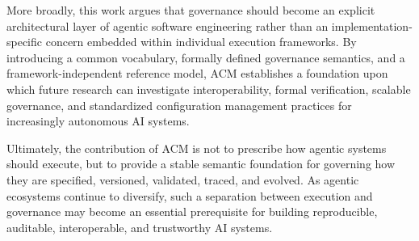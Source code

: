 \documentclass[10pt]{article}
\begin{document}
More broadly, this work argues that governance should become an explicit architectural layer of agentic software engineering rather than an implementation-specific concern embedded within individual execution frameworks. By introducing a common vocabulary, formally defined governance semantics, and a framework-independent reference model, ACM establishes a foundation upon which future research can investigate interoperability, formal verification, scalable governance, and standardized configuration management practices for increasingly autonomous AI systems.

Ultimately, the contribution of ACM is not to prescribe how agentic systems should execute, but to provide a stable semantic foundation for governing how they are specified, versioned, validated, traced, and evolved. As agentic ecosystems continue to diversify, such a separation between execution and governance may become an essential prerequisite for building reproducible, auditable, interoperable, and trustworthy AI systems.
\end{document}
